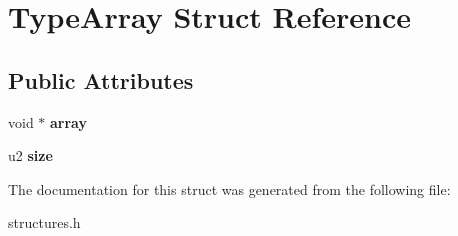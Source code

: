 \hypertarget{structTypeArray}{}\section{Type\+Array Struct Reference}
\label{structTypeArray}
\subsection*{Public Attributes}
\begin{DoxyCompactItemize}
\item 
void $\ast$ {\bfseries array}\hypertarget{structTypeArray_a6126c1f56950b1821af98aa19d4c5cdc}{}\label{structTypeArray_a6126c1f56950b1821af98aa19d4c5cdc}

\item 
u2 {\bfseries size}\hypertarget{structTypeArray_a51c37b7d51078be5f6f6dc83c58fdb22}{}\label{structTypeArray_a51c37b7d51078be5f6f6dc83c58fdb22}

\end{DoxyCompactItemize}


The documentation for this struct was generated from the following file\+:\begin{DoxyCompactItemize}
\item 
structures.\+h\end{DoxyCompactItemize}
